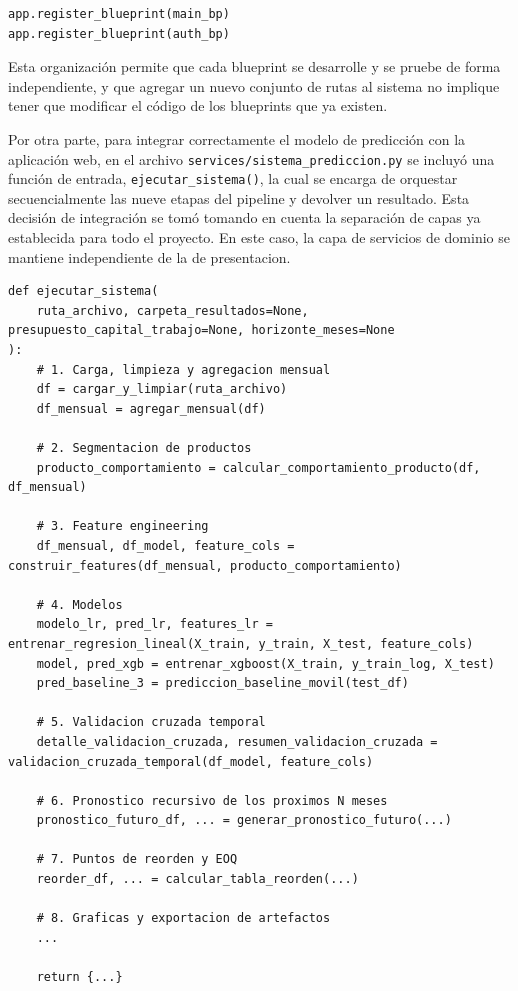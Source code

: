 \label{lst:registro_blueprints}
\begin{verbatim}
app.register_blueprint(main_bp)
app.register_blueprint(auth_bp)
\end{verbatim}

Esta organización permite que cada blueprint se desarrolle y se pruebe de forma independiente, y que agregar un nuevo conjunto de rutas al sistema no implique tener que modificar el código de los blueprints que ya existen.

Por otra parte, para integrar correctamente el modelo de predicción con la aplicación web, en el archivo \texttt{services/sistema\_prediccion.py} se incluyó una función de entrada, \texttt{ejecutar\_sistema()}, la cual se encarga de orquestar secuencialmente las nueve etapas del pipeline y devolver un resultado. Esta decisión de integración se tomó tomando en cuenta la separación de capas ya establecida para todo el proyecto. En este caso, la capa de servicios de dominio se mantiene independiente de la de presentacion.

\label{lst:ejecutar_sistema}
\begin{verbatim}
def ejecutar_sistema(
    ruta_archivo, carpeta_resultados=None, presupuesto_capital_trabajo=None, horizonte_meses=None
):
    # 1. Carga, limpieza y agregacion mensual 
    df = cargar_y_limpiar(ruta_archivo)
    df_mensual = agregar_mensual(df)

    # 2. Segmentacion de productos
    producto_comportamiento = calcular_comportamiento_producto(df, df_mensual)

    # 3. Feature engineering
    df_mensual, df_model, feature_cols = construir_features(df_mensual, producto_comportamiento)

    # 4. Modelos
    modelo_lr, pred_lr, features_lr = entrenar_regresion_lineal(X_train, y_train, X_test, feature_cols)
    model, pred_xgb = entrenar_xgboost(X_train, y_train_log, X_test)
    pred_baseline_3 = prediccion_baseline_movil(test_df)

    # 5. Validacion cruzada temporal
    detalle_validacion_cruzada, resumen_validacion_cruzada = validacion_cruzada_temporal(df_model, feature_cols)

    # 6. Pronostico recursivo de los proximos N meses
    pronostico_futuro_df, ... = generar_pronostico_futuro(...)

    # 7. Puntos de reorden y EOQ
    reorder_df, ... = calcular_tabla_reorden(...)

    # 8. Graficas y exportacion de artefactos
    ...

    return {...}
\end{verbatim}

